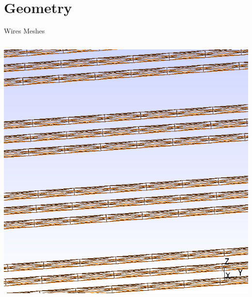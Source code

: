 \documentclass[xcolor=dvipsnames]{beamer}
\begin{document}
\section{Geometry}

\begin{frame}{Wires Meshes}

  \footnotesize

  \begin{columns}
    \begin{column}{0.3\textwidth}
      \begin{center}
        \includegraphics[height=0.4\textheight]{parallel-mesh.png}      
        

\end{center}
\end{column}
\end{columns}
\end{frame}
\end{document}
